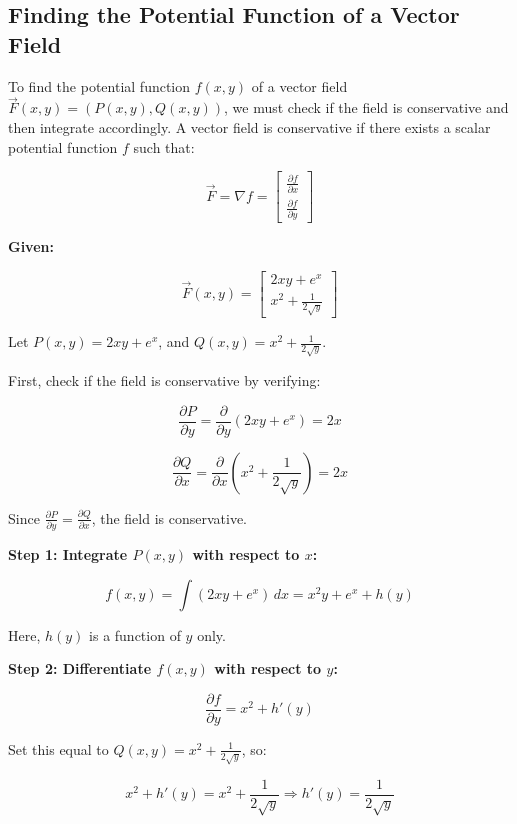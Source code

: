 \subsection{Finding the Potential Function of a Vector Field}

To find the potential function \( f(x, y) \) of a vector field \( \vec{F}(x, y) = (P(x, y), Q(x, y)) \), 
we must check if the field is conservative and then integrate accordingly. A vector field is conservative 
if there exists a scalar potential function \( f \) such that:

\[
    \vec{F} = \nabla f = 
    \begin{bmatrix}
        \frac{\partial f}{\partial x} \\ 
        \frac{\partial f}{\partial y}
    \end{bmatrix} 
\]

\textbf{Given:}

\[
    \vec{F}(x, y) = 
    \begin{bmatrix}
    2xy + e^x \\
    x^2 + \frac{1}{2\sqrt{y}}
    \end{bmatrix}
\]

Let \( P(x, y) = 2xy + e^x \), and \( Q(x, y) = x^2 + \frac{1}{2\sqrt{y}} \).

First, check if the field is conservative by verifying:

\[
    \frac{\partial P}{\partial y} = \frac{\partial}{\partial y}(2xy + e^x) = 2x
\]

\[
    \frac{\partial Q}{\partial x} = \frac{\partial}{\partial x}\left(x^2 + \frac{1}{2\sqrt{y}}\right) 
    = 2x
\]

Since \( \frac{\partial P}{\partial y} = \frac{\partial Q}{\partial x} \), the field is conservative.

\textbf{Step 1: Integrate \( P(x, y) \) with respect to \(x\):}

\[
    f(x, y) = \int (2xy + e^x)\,dx = x^2y + e^x + h(y)
\]

Here, \( h(y) \) is a function of \(y\) only.

\textbf{Step 2: Differentiate \( f(x, y) \) with respect to \(y\):}

\[
    \frac{\partial f}{\partial y} = x^2 + h'(y)
\]

Set this equal to \( Q(x, y) = x^2 + \frac{1}{2\sqrt{y}} \), so:

\[
    x^2 + h'(y) = x^2 + \frac{1}{2\sqrt{y}} \Rightarrow h'(y) = \frac{1}{2\sqrt{y}}
\]

